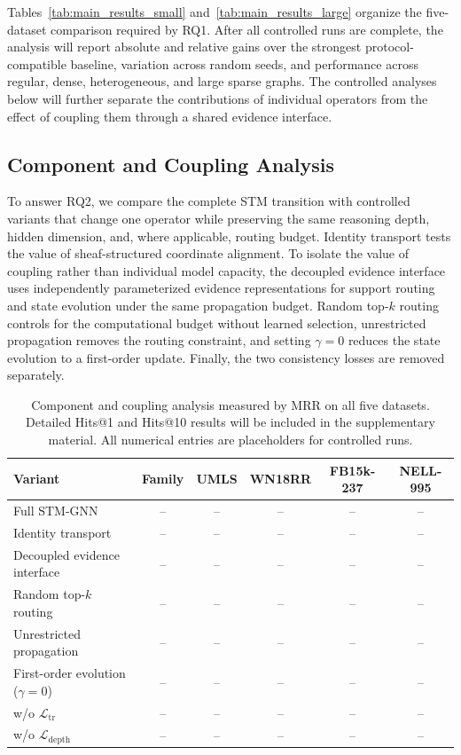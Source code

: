 \documentclass[a4paper,fleqn]{cas-sc}
\begin{document}
Tables~\ref{tab:main_results_small} and~\ref{tab:main_results_large} organize the
five-dataset comparison required by RQ1. After all controlled runs are complete,
the analysis will report absolute and relative gains over the strongest
protocol-compatible baseline, variation across random seeds, and performance
across regular, dense, heterogeneous, and large sparse graphs. The controlled
analyses below will further separate the contributions of individual operators
from the effect of coupling them through a shared evidence interface.

\subsection{Component and Coupling Analysis}\label{subsec:ablation}

To answer RQ2, we compare the complete STM transition with controlled variants
that change one operator while preserving the same reasoning depth, hidden
dimension, and, where applicable, routing budget. Identity transport tests the
value of sheaf-structured coordinate alignment. To isolate the value of coupling
rather than individual model capacity, the decoupled evidence interface uses
independently parameterized evidence representations for support routing and
state evolution under the same propagation budget. Random top-$k$ routing
controls for the computational budget without learned selection, unrestricted
propagation removes the routing constraint, and setting $\gamma=0$ reduces the
state evolution to a first-order update. Finally, the two consistency losses are
removed separately.

\begin{table}[t]
\caption{Component and coupling analysis measured by MRR on all five datasets.
Detailed Hits@1 and Hits@10 results will be included in the supplementary
material. All numerical entries are placeholders for controlled runs.}
\label{tab:ablation}
\centering
\small
\begin{tabular}{lccccc}
\toprule
Variant & Family & UMLS & WN18RR & FB15k-237 & NELL-995 \\
\midrule
Full STM-GNN & -- & -- & -- & -- & -- \\
Identity transport & -- & -- & -- & -- & -- \\
Decoupled evidence interface & -- & -- & -- & -- & -- \\
Random top-$k$ routing & -- & -- & -- & -- & -- \\
Unrestricted propagation & -- & -- & -- & -- & -- \\
First-order evolution ($\gamma=0$) & -- & -- & -- & -- & -- \\
w/o $\mathcal{L}_{\mathrm{tr}}$ & -- & -- & -- & -- & -- \\
w/o $\mathcal{L}_{\mathrm{depth}}$ & -- & -- & -- & -- & -- \\
\bottomrule
\end{tabular}
\end{table}
\end{document}
